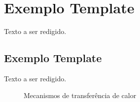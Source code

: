 \section{Exemplo Template}
Texto a ser redigido.

\subsection{Exemplo Template}

Texto a ser redigido.

\begin{figure}[H]
\centering
\caption{Mecanismos de transferência de calor}
\end{figure}